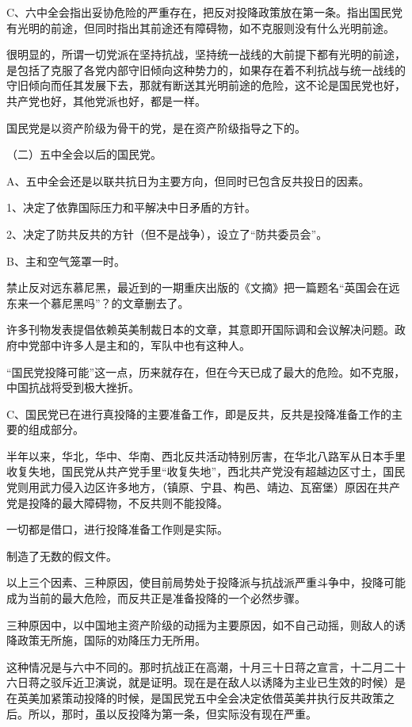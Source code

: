 C、六中全会指出妥协危险的严重存在，把反对投降政策放在第一条。指出国民党有光明的前途，但同时指出其前途还有障碍物，如不克服则没有什么光明前途。

很明显的，所谓一切党派在坚持抗战，坚持统一战线的大前提下都有光明的前途，是包括了克服了各党内部守旧倾向这种势力的，如果存在着不利抗战与统一战线的守旧倾向而任其发展下去，那就有断送其光明前途的危险，这不论是国民党也好，共产党也好，其他党派也好，都是一样。

国民党是以资产阶级为骨干的党，是在资产阶级指导之下的。

（二）五中全会以后的国民党。

A、五中全会还是以联共抗日为主要方向，但同时已包含反共投日的因素。

1、决定了依靠国际压力和平解决中日矛盾的方针。

2、决定了防共反共的方针（但不是战争），设立了“防共委员会”。

B、主和空气笼罩一时。

禁止反对远东慕尼黑，最近到的一期重庆出版的《文摘》把一篇题名“英国会在远东来一个慕尼黑吗”？的文章删去了。

许多刊物发表提倡依赖英美制裁日本的文章，其意即开国际调和会议解决问题。政府中党部中许多人是主和的，军队中也有这种人。

“国民党投降可能”这一点，历来就存在，但在今天已成了最大的危险。如不克服，中国抗战将受到极大挫折。

C、国民党已在进行真投降的主要准备工作，即是反共，反共是投降准备工作的主要的组成部分。

半年以来，华北，华中、华南、西北反共活动特别厉害，在华北八路军从日本手里收复失地，国民党从共产党手里“收复失地”，西北共产党没有超越边区寸土，国民党则用武力侵入边区许多地方，（镇原、宁县、构邑、靖边、瓦窑堡）原因在共产党是投降的最大障碍物，不反共则不能投降。

一切都是借口，进行投降准备工作则是实际。

制造了无数的假文件。

以上三个因素、三种原因，使目前局势处于投降派与抗战派严重斗争中，投降可能成为当前的最大危险，而反共正是准备投降的一个必然步骤。

三种原因中，以中国地主资产阶级的动摇为主要原因，如不自己动摇，则敌人的诱降政策无所施，国际的劝降压力无所用。

这种情况是与六中不同的。那时抗战正在高潮，十月三十日蒋之宣言，十二月二十六日蒋之驳斥近卫演说，就是证明。现在是在敌人以诱降为主业已生效的时候）是在英美加紧策动投降的时候，是国民党五中全会决定依借英美井执行反共政策之后。所以，那时，虽以反投降为第一条，但实际没有现在严重。

